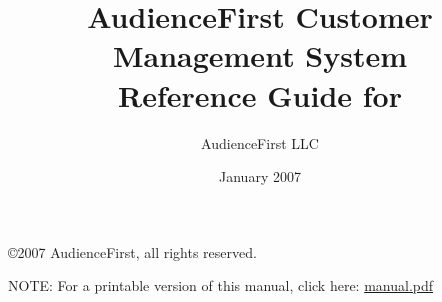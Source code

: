 \documentclass{article}
\title{AudienceFirst Customer Management System \\ 
Reference Guide for \venue}
\author{AudienceFirst LLC}
\date{January 2007}
\begin{document}

\copyright{2007 AudienceFirst, all rights reserved.} 

\maketitle

NOTE: For a printable version of this manual, click here:
\url{manual.pdf}

\tableofcontents











\end{document}
